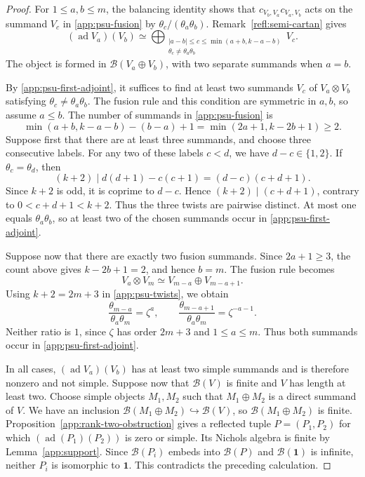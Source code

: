\documentclass[11pt, a4paper]{article}
\numberwithin{equation}{section}
\newcommand{\B}{\mathcal B}
\newcommand{\one}{\mathbf 1}
\DeclareMathOperator{\ad}{ad}
\begin{document}
\begin{proof}
For $1\le a,b\le m$, the balancing identity shows that
$c_{V_b,V_a}c_{V_a,V_b}$ acts on the summand $V_c$ in
\eqref{app:psu-fusion} by $\theta_c/(\theta_a\theta_b)$.
Remark~\ref{refl:semi-cartan} gives
\begin{equation}\label{app:psu-first-adjoint}
 (\ad V_a)(V_b)\simeq
 \bigoplus_{\substack{|a-b|\le c\le\min(a+b,k-a-b)\\
                     \theta_c\ne\theta_a\theta_b}}V_c.
\end{equation}
The object is formed in $\B(V_a\oplus V_b)$, with two
separate summands when $a=b$.

By \eqref{app:psu-first-adjoint}, it suffices to find at least
two summands $V_c$ of $V_a\otimes V_b$ satisfying
$\theta_c\ne\theta_a\theta_b$.
The fusion rule and this condition are symmetric in $a,b$,
so assume $a\le b$.
The number of summands in \eqref{app:psu-fusion} is
\[
 \min(a+b,k-a-b)-(b-a)+1
 =\min(2a+1,k-2b+1)\ge2.
\]
Suppose first that there are at least three  summands,
and choose three consecutive labels.
For any two of these labels $c<d$, we have $d-c\in\{1,2\}$.
If $\theta_c=\theta_d$, then
\[
 (k+2)\mid d(d+1)-c(c+1)
          =(d-c)(c+d+1).
\]
Since $k+2$ is odd, it is coprime to $d-c$.
Hence $(k+2)\mid(c+d+1)$, contrary to
$0<c+d+1<k+2$.
Thus the three twists are pairwise distinct.
At most one equals $\theta_a\theta_b$, so at least two
of the chosen summands occur in
\eqref{app:psu-first-adjoint}.

Suppose now that there are exactly two fusion summands.
Since $2a+1\ge3$, the count above gives $k-2b+1=2$,
and hence $b=m$.
The fusion rule becomes
\[
 V_a\otimes V_m\simeq V_{m-a}\oplus V_{m-a+1}.
\]
Using $k+2=2m+3$ in \eqref{app:psu-twists}, we obtain
\[
 \frac{\theta_{m-a}}{\theta_a\theta_m}=\zeta^a,
 \qquad
 \frac{\theta_{m-a+1}}{\theta_a\theta_m}=\zeta^{-a-1}.
\]
Neither ratio is $1$, since $\zeta$ has order $2m+3$
and $1\le a\le m$.
Thus both summands occur in \eqref{app:psu-first-adjoint}.

In all cases, $(\ad V_a)(V_b)$ has at least two simple
summands and is therefore nonzero and not simple.
Suppose now that $\B(V)$ is finite and $V$ has length at least two.
Choose simple objects $M_1,M_2$ such that $M_1\oplus M_2$
is a direct summand of $V$.
We have an inclusion
$\B(M_1\oplus M_2)\hookrightarrow\B(V)$, so
$\B(M_1\oplus M_2)$ is finite.
Proposition~\ref{app:rank-two-obstruction} gives a reflected tuple
$P=(P_1,P_2)$ for which $(\operatorname{ad}(P_1)(P_2))$ is zero or simple.
Its Nichols algebra is finite by Lemma~\ref{app:support}.
Since $\B(P_i)$ embeds into $\B(P)$ and $\B(\one)$ is infinite,
neither $P_i$ is isomorphic to $\one$.
This contradicts the preceding calculation.
\end{proof}
\end{document}
